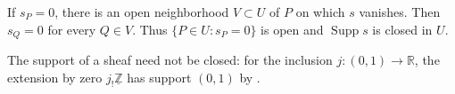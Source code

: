 If $s_P=0$, there is an open neighborhood $V\subset U$ of $P$ on which $s$ vanishes. Then $s_Q=0$ for every $Q\in V$. Thus $\{P\in U:s_P=0\}$ is open and $\operatorname{Supp}s$ is closed in $U$.

The support of a sheaf need not be closed: for the inclusion $j:(0,1)\to\mathbb R$, the extension by zero $j_!\underline{\mathbb Z}$ has support $(0,1)$ by .
